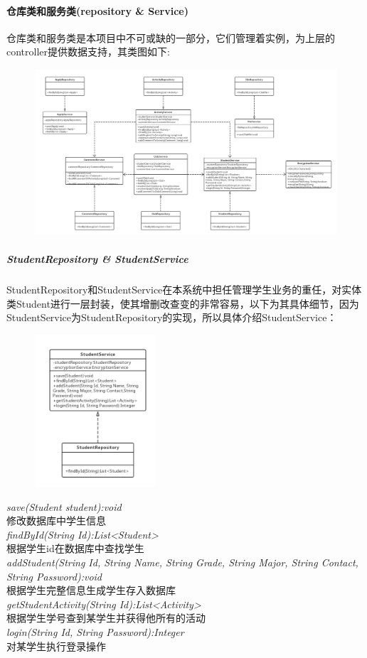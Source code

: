 \documentclass[UTF8]{ctexart}
\begin{document}
\paragraph{仓库类和服务类(repository \& Service)}
仓库类和服务类是本项目中不可或缺的一部分，它们管理着实例，为上层的controller提供数据支持，其类图如下:
\newline
\begin{figure}[H]
\centering
\includegraphics[width = 1.1\textwidth]{repository-service.png}
\end{figure}

\subparagraph{StudentRepository \& StudentService}
StudentRepository和StudentService在本系统中担任管理学生业务的重任，对实体类Student进行一层封装，使其增删改查变的非常容易，以下为其具体细节，因为StudentService为StudentRepository的实现，所以具体介绍StudentService：
\newline
\begin{figure}[H]
\centering
\includegraphics[width = 0.4\textwidth]{student-rs.png}
\end{figure}
\begin{center}
\emph{save(Student student):void}\\
修改数据库中学生信息\\ 
\emph{findById(String Id):List<Student>}\\
根据学生id在数据库中查找学生\\
\emph{addStudent(String Id, String Name, String Grade, String Major, String Contact, String Password):void}\\
根据学生完整信息生成学生存入数据库\\
\emph{getStudentActivity(String Id):List<Activity>}\\
根据学生学号查到某学生并获得他所有的活动\\
\emph{login(String Id, String Password):Integer}\\
对某学生执行登录操作
\end{center}
\end{document}
